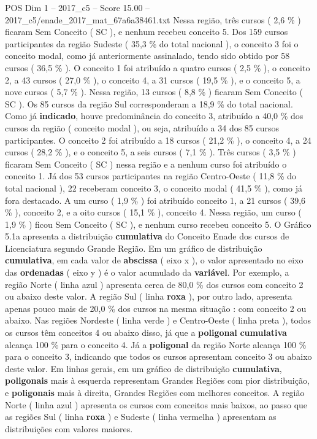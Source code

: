 \begin{textsample}{POS Dim 1 – 2017\_c5 – Score 15.00 – 2017\_c5/enade\_2017\_mat\_67a6a38461.txt}
Nessa região, três cursos ( 2,6 \% ) ficaram Sem Conceito ( SC ), e nenhum recebeu conceito 5.
Dos 159 cursos participantes da região Sudeste ( 35,3 \% do total nacional ), o conceito 3 foi o conceito modal, como já anteriormente assinalado, tendo sido obtido por 58 cursos ( 36,5 \% ).
O conceito 1 foi atribuído a quatro cursos ( 2,5 \% ), o conceito 2, a 43 cursos ( 27,0 \% ), o conceito 4, a 31 cursos ( 19,5 \% ), e o conceito 5, a nove cursos ( 5,7 \% ).
Nessa região, 13 cursos ( 8,8 \% ) ficaram Sem Conceito ( SC ).
Os 85 cursos da região Sul corresponderam a 18,9 \% do total nacional.
Como já \textbf{indicado}, houve predominância do conceito 3, atribuído a 40,0 \% dos cursos da região ( conceito modal ), ou seja, atribuído a 34 dos 85 cursos participantes.
O conceito 2 foi atribuído a 18 cursos ( 21,2 \% ), o conceito 4, a 24 cursos ( 28,2 \% ), e o conceito 5, a seis cursos ( 7,1 \% ).
Três cursos ( 3,5 \% ) ficaram Sem Conceito ( SC ) nessa região e a nenhum curso foi atribuído o conceito 1.
Já dos 53 cursos participantes na região Centro-Oeste ( 11,8 \% do total nacional ), 22 receberam conceito 3, o conceito modal ( 41,5 \% ), como já fora destacado.
A um curso ( 1,9 \% ) foi atribuído conceito 1, a 21 cursos ( 39,6 \% ), conceito 2, e a oito cursos ( 15,1 \% ), conceito 4.
Nessa região, um curso ( 1,9 \% ) ficou Sem Conceito ( SC ), e nenhum curso recebeu conceito 5.
O Gráfico 5.1a apresenta a distribuição \textbf{cumulativa} do Conceito Enade dos cursos de Licenciatura segundo Grande Região.
Em um gráfico de distribuição \textbf{cumulativa}, em cada valor de \textbf{abscissa} ( eixo x ), o valor apresentado no eixo das \textbf{ordenadas} ( eixo y ) é o valor acumulado da \textbf{variável}.
Por exemplo, a região Norte ( linha azul ) apresenta cerca de 80,0 \% dos cursos com conceito 2 ou abaixo deste valor.
A região Sul ( linha \textbf{roxa} ), por outro lado, apresenta apenas pouco mais de 20,0 \% dos cursos na mesma situação : com conceito 2 ou abaixo.
Nas regiões Nordeste ( linha verde ) e Centro-Oeste ( linha preta ), todos os cursos têm conceitos 4 ou abaixo disso, já que a \textbf{poligonal} \textbf{cumulativa} alcança 100 \% para o conceito 4.
Já a \textbf{poligonal} da região Norte alcança 100 \% para o conceito 3, indicando que todos os cursos apresentam conceito 3 ou abaixo deste valor.
Em linhas gerais, em um gráfico de distribuição \textbf{cumulativa}, \textbf{poligonais} mais à esquerda representam Grandes Regiões com pior distribuição, e \textbf{poligonais} mais à direita, Grandes Regiões com melhores conceitos.
A região Norte ( linha azul ) apresenta os cursos com conceitos mais baixos, ao passo que as regiões Sul ( linha \textbf{roxa} ) e Sudeste ( linha vermelha ) apresentam as distribuições com valores maiores.

\end{textsample}
